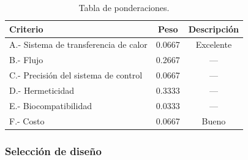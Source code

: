 \begin{table}[H]
\centering
\caption{Tabla de pertenencia.}
\label{tab:pertenencia}
\renewcommand{\arraystretch}{1.3}
\small
{}
\end{table}

\begin{table}[H]
\centering
\caption{Tabla de ponderaciones.}
\label{tab:ponderaciones}
\renewcommand{\arraystretch}{1.3}
\small
\begin{tabular}{lcc}
\toprule
\textbf{Criterio} & \textbf{Peso} & \textbf{Descripción} \\
\midrule
A.- Sistema de transferencia de calor & 0.0667 & Excelente \\
B.- Flujo                              & 0.2667 & --- \\
C.- Precisión del sistema de control   & 0.0667 & --- \\
D.- Hermeticidad                       & 0.3333 & --- \\
E.- Biocompatibilidad                  & 0.0333 & --- \\
F.- Costo                              & 0.0667 & Bueno \\
\bottomrule
\end{tabular}
\end{table}

\subsubsection{Selección de diseño}

